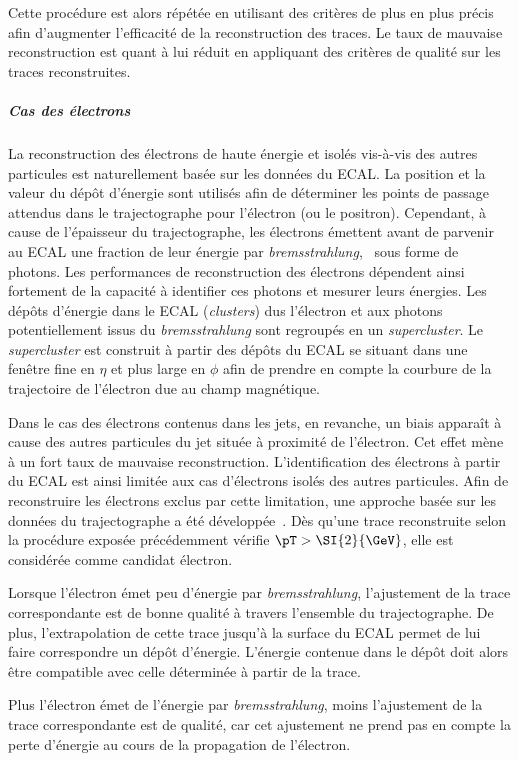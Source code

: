 Cette procédure est alors répétée en utilisant des critères de plus en plus précis afin d'augmenter l'efficacité de la reconstruction des traces.
Le taux de mauvaise reconstruction est quant à lui réduit en appliquant des critères de qualité sur les traces reconstruites.
\subparagraph{Cas des électrons}
La reconstruction des électrons de haute énergie et isolés vis-à-vis des autres particules est naturellement basée sur les données du ECAL.
La position et la valeur du dépôt d'énergie sont utilisés afin de déterminer les points de passage attendus dans le trajectographe pour l'électron (ou le positron).
Cependant, à cause de l'épaisseur du trajectographe, les électrons émettent avant de parvenir au ECAL une fraction de leur énergie par \emph{bremsstrahlung}, \ie\ sous forme de photons.
Les performances de reconstruction des électrons dépendent ainsi fortement de la capacité à identifier ces photons et mesurer leurs énergies.
Les dépôts d'énergie dans le ECAL (\emph{clusters}) dus l'électron et aux photons potentiellement issus du \emph{bremsstrahlung} sont regroupés en un \emph{supercluster}.
Le \emph{supercluster} est construit à partir des dépôts du ECAL se situant dans une fenêtre fine en $\eta$ et plus large en $\phi$ afin de prendre en compte la courbure de la trajectoire de l'électron due au champ magnétique.
\par
Dans le cas des électrons contenus dans les jets, en revanche, un biais apparaît à cause des autres particules du jet située à proximité de l'électron.
Cet effet mène à un fort taux de mauvaise reconstruction.
L'identification des électrons à partir du ECAL est ainsi limitée aux cas d'électrons isolés des autres particules.
Afin de reconstruire les électrons exclus par cette limitation, une approche basée sur les données du trajectographe a été développée~\cite{particle-flow}.
Dès qu'une trace reconstruite selon la procédure exposée précédemment vérifie $\pT>\SI{2}{\GeV}$, elle est considérée comme candidat électron.
\par
Lorsque l'électron émet peu d'énergie par \emph{bremsstrahlung}, l'ajustement de la trace correspondante est de bonne qualité à travers l'ensemble du trajectographe.
De plus, l'extrapolation de cette trace jusqu'à la surface du ECAL permet de lui faire correspondre un dépôt d'énergie.
L'énergie contenue dans le dépôt doit alors être compatible avec celle déterminée à partir de la trace.
\par
Plus l'électron émet de l'énergie par \emph{bremsstrahlung}, moins l'ajustement de la trace correspondante est de qualité, car cet ajustement ne prend pas en compte la perte d'énergie au cours de la propagation de l'électron.
